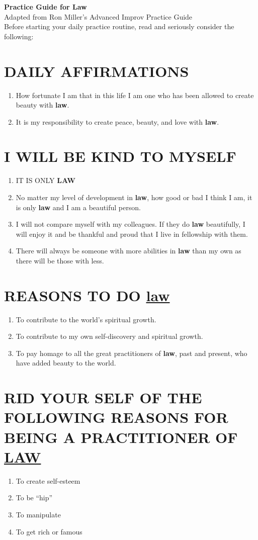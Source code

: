 \documentclass[11pt,letterpaper,onecolumn]{article}
\begin{document}
\begingroup
  \centering
  \LARGE \textbf{Practice Guide for Law}\\[0.5em]
  \large Adapted from Ron Miller's Advanced Improv Practice Guide\\[1.5em]
  \large Before starting your daily practice routine, read and seriously consider the following:\par
\endgroup

\section{DAILY AFFIRMATIONS}

\begin{enumerate}
    \item How fortunate I am that in this life I am one who has been allowed to create beauty with \textbf{law}.
    \item It is my responsibility to create peace, beauty, and love with \textbf{law}.
\end{enumerate}

\section{I WILL BE KIND TO MYSELF}

\begin{enumerate}
    \item IT IS ONLY \textbf{LAW}
    \item No matter my level of development in \textbf{law}, how good or bad I think I am, it is only \textbf{law} and I am a beautiful person.
    \item I will not compare myself with my colleagues. If they do \textbf{law} beautifully, I will enjoy it and be thankful and proud that I live in fellowship with them.
    \item There will always be someone with more abilities in \textbf{law} than my own as there will be those with less.
\end{enumerate}

\section{REASONS TO DO \uline{law}}

\begin{enumerate}
    \item To contribute to the world's spiritual growth.
    \item To contribute to my own self-discovery and spiritual growth.
    \item To pay homage to all the great practitioners of \textbf{law}, past and present, who have added beauty to the world.
\end{enumerate}

\section{RID YOUR SELF OF THE FOLLOWING REASONS FOR BEING A PRACTITIONER OF \uline{LAW}}

\begin{multicols}{2}
\begin{enumerate}
    \item To create self-esteem
    \item To be ``hip''
    \item To manipulate
    \item To get rich or famous
\end{enumerate}
\end{multicols}
\end{document}
